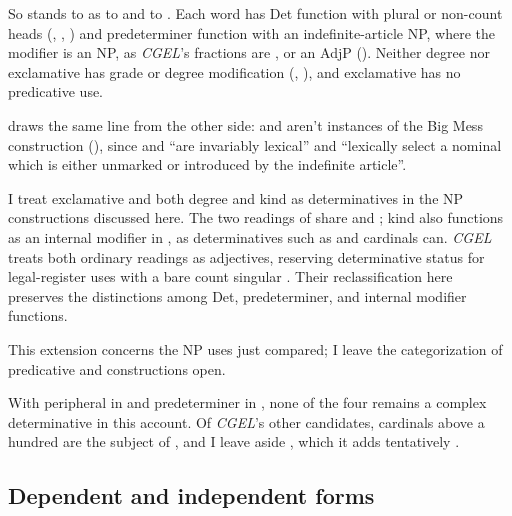 \documentclass[12pt]{article}
\begin{document}
So  stands to  as  to  and  to . Each word has Det function with plural or non-count heads (, , ) and predeterminer function with an indefinite-article NP, where the modifier is an NP, as \textit{CGEL}'s fractions are \citep[385 n.~25]{huddleston2002}, or an AdjP (). Neither degree  nor exclamative  has grade or degree modification (, ), and exclamative  has no predicative use.

\textcite[§5]{VanEynde_2007_BigMess} draws the same line from the other side:  and  aren't instances of the Big Mess construction (), since  and  \enquote{are invariably lexical} and \enquote{lexically select a nominal which is either unmarked or introduced by the indefinite article}.

I treat exclamative  and both degree and kind  as determinatives in the NP constructions discussed here. The two readings of  share  and ; kind  also functions as an internal modifier in , as determinatives such as  and cardinals can. \textit{CGEL} treats both ordinary readings as adjectives, reserving determinative status for legal-register uses with a bare count singular \citep[435 and n.~52]{huddleston2002}. Their reclassification here preserves the distinctions among Det, predeterminer, and internal modifier functions.

This extension concerns the NP uses just compared; I leave the categorization of predicative  and  constructions open.

With peripheral  in  and predeterminer  in , none of the four remains a complex determinative in this account. Of \textit{CGEL}'s other candidates, cardinals above a hundred are the subject of \textcite{reynolds2026numerals}, and I leave aside , which it adds tentatively \citep[393]{huddleston2002}.

\subsection{Dependent and independent forms}\label{sec:form-selection}
\end{document}
